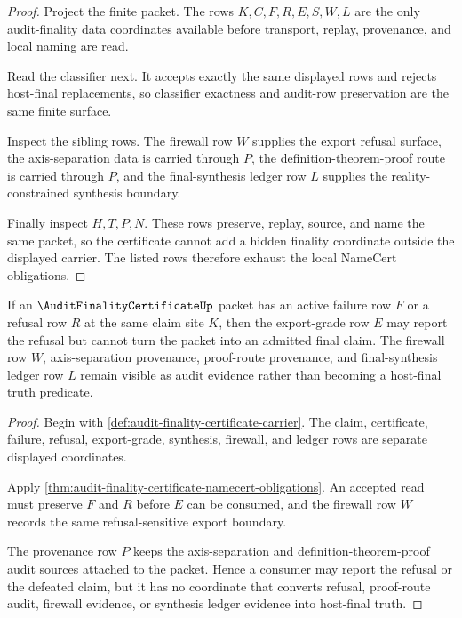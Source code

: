 \begin{proof}
Project the finite packet. The rows $K,C,F,R,E,S,W,L$ are the only audit-finality data coordinates available before transport, replay, provenance, and local naming are read.

Read the classifier next. It accepts exactly the same displayed rows and rejects host-final replacements, so classifier exactness and audit-row preservation are the same finite surface.

Inspect the sibling rows. The firewall row $W$ supplies the export refusal surface, the axis-separation data is carried through $P$, the definition-theorem-proof route is carried through $P$, and the final-synthesis ledger row $L$ supplies the reality-constrained synthesis boundary.

Finally inspect $H,T,P,N$. These rows preserve, replay, source, and name the same packet, so the certificate cannot add a hidden finality coordinate outside the displayed carrier. The listed rows therefore exhaust the local NameCert obligations.
\end{proof}

\begin{theorem}
\label{thm:audit-finality-certificate-export-refusal}
If an $\AuditFinalityCertificateUp$ packet has an active failure row $F$ or a refusal row $R$ at the same claim site $K$, then the export-grade row $E$ may report the refusal but cannot turn the packet into an admitted final claim. The firewall row $W$, axis-separation provenance, proof-route provenance, and final-synthesis ledger row $L$ remain visible as audit evidence rather than becoming a host-final truth predicate.
\end{theorem}
\begin{proof}
Begin with \autoref{def:audit-finality-certificate-carrier}. The claim, certificate, failure, refusal, export-grade, synthesis, firewall, and ledger rows are separate displayed coordinates.

Apply \autoref{thm:audit-finality-certificate-namecert-obligations}. An accepted read must preserve $F$ and $R$ before $E$ can be consumed, and the firewall row $W$ records the same refusal-sensitive export boundary.

The provenance row $P$ keeps the axis-separation and definition-theorem-proof audit sources attached to the packet. Hence a consumer may report the refusal or the defeated claim, but it has no coordinate that converts refusal, proof-route audit, firewall evidence, or synthesis ledger evidence into host-final truth.
\end{proof}

